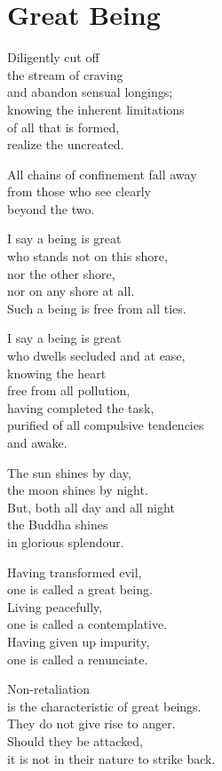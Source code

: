 
\chapter{Great Being}


Diligently cut off\\
the stream of craving\\
and abandon sensual longings;\\
knowing the inherent limitations\\
of all that is formed,\\
realize the uncreated.


All chains of confinement fall away\\
from those who see clearly\\
beyond the two.


I say a being is great\\
who stands not on this shore,\\
nor the other shore,\\
nor on any shore at all.\\
Such a being is free from all ties.


I say a being is great\\
who dwells secluded and at ease,\\
knowing the heart\\
free from all pollution,\\
having completed the task,\\
purified of all compulsive tendencies\\
and awake.


The sun shines by day,\\
the moon shines by night.\\
But, both all day and all night\\
the Buddha shines\\
in glorious splendour.


Having transformed evil,\\
one is called a great being.\\
Living peacefully,\\
one is called a contemplative.\\
Having given up impurity,\\
one is called a renunciate.


Non-retaliation\\
is the characteristic of great beings.\\
They do not give rise to anger.\\
Should they be attacked,\\
it is not in their nature to strike back.


